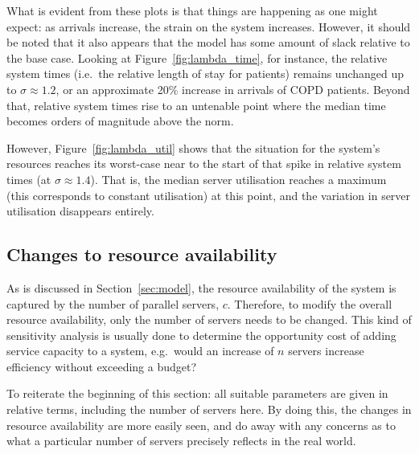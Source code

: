 \documentclass[11pt]{article}
\begin{document}
What is evident from these plots is that things are happening as one might
expect: as arrivals increase, the strain on the system increases. However, it
should be noted that it also appears that the model has some amount of slack
relative to the base case. Looking at Figure~\ref{fig:lambda_time}, for
instance, the relative system times (i.e.\ the relative length of stay for
patients) remains unchanged up to \(\sigma \approx 1.2\), or an approximate 20\%
increase in arrivals of COPD patients. Beyond that, relative system times rise
to an untenable point where the median time becomes orders of magnitude above
the norm.

However, Figure~\ref{fig:lambda_util} shows that the situation for the system's
resources reaches its worst-case near to the start of that spike in relative
system times (at \(\sigma \approx 1.4\)). That is, the median server utilisation
reaches a maximum (this corresponds to constant utilisation) at this point, and
the variation in server utilisation disappears entirely.


\subsection{Changes to resource availability}\label{subsec:resources}

As is discussed in Section~\ref{sec:model}, the resource availability of the
system is captured by the number of parallel servers, \(c\). Therefore, to
modify the overall resource availability, only the number of servers needs to be
changed. This kind of sensitivity analysis is usually done to determine the
opportunity cost of adding service capacity to a system, e.g.\ would an increase
of \(n\) servers increase efficiency without exceeding a budget?

To reiterate the beginning of this section: all suitable parameters are given in
relative terms, including the number of servers here. By doing this, the
changes in resource availability are more easily seen, and do away with any
concerns as to what a particular number of servers precisely reflects in the
real world.
\end{document}
